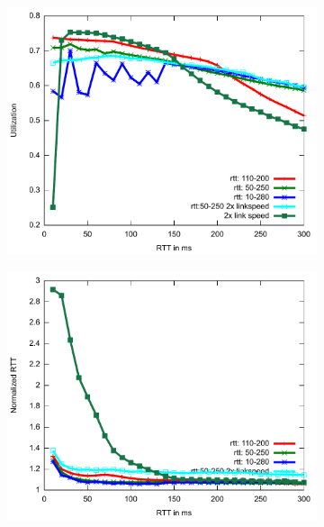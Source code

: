 \begin{figure}
\centering
\begin{subfigure}[b]{0.33\textwidth}
\includegraphics[width=\textwidth]{figures/rtt-robust-tpt.pdf}
\end{subfigure}
\begin{subfigure}[b]{0.33\textwidth}
\includegraphics[width=\textwidth]{figures/rtt-robust-delay.pdf}
\end{subfigure}
\begin{subfigure}[b]{0.33\textwidth}

\end{subfigure}
\end{figure}
